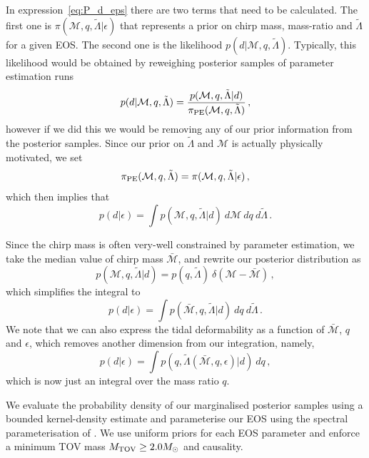 \documentclass[twocolumn]{aastex631}
\begin{document}
In expression~\eqref{eq:P_d_eps} there are two terms that need to be
calculated. The first one is $\pi(\mathcal{M}, q,
\tilde{\Lambda}|\epsilon)$ that represents a prior on chirp mass,
mass-ratio and $\tilde{\Lambda}$ for a given EOS. The second
one is the likelihood $p(d|\mathcal{M},q,\tilde{\Lambda})$. Typically,
this likelihood would be obtained by reweighing posterior samples of
parameter estimation runs
%
\begin{equation}
    p(d|\mathcal{M},q,\tilde{\Lambda}) =
    \frac{p(\mathcal{M},q,\tilde{\Lambda}|d)}{\pi_{\rm
        PE}(\mathcal{M},q,\tilde{\Lambda})}\,,
\end{equation}
%
however if we did this we would be removing any of our prior information
from the posterior samples. Since our prior on $\tilde{\Lambda}$ and
$\mathcal{M}$ is actually physically motivated, we set
%
\begin{equation}
    \pi_{\rm PE}(\mathcal{M},q,\tilde{\Lambda}) =
    \pi(\mathcal{M},q,\tilde{\Lambda}|\epsilon)\,,
\end{equation}
%
which then implies that
%
\begin{equation}
    p(d|\epsilon) = \int p(\mathcal{M},q,\tilde{\Lambda}|d)\ d
    \mathcal{M} \ d q \ d \tilde{\Lambda}\,.
\end{equation}

Since the chirp mass is often very-well constrained by parameter
estimation, we take the median value of chirp mass $\bar{\mathcal{M}}$,
and rewrite our posterior distribution as
%
\begin{equation}
    p(\mathcal{M},q,\tilde{\Lambda}|d) = p(q,\tilde{\Lambda})
    \ \delta(\mathcal{M}- \bar{\mathcal{M}})\,,
\end{equation}
%
which simplifies the integral to
%
\begin{equation}
    p(d|\epsilon) = \int p(\bar{\mathcal{M}},q,\tilde{\Lambda}|d)\ d q
    \ d \tilde{\Lambda}\,.
\end{equation}
%
We note that we can also express the tidal deformability as a function of
$\bar{\mathcal{M}}$, $q$ and $\epsilon$, which removes another dimension
from our integration, namely,
%
\begin{equation}
        p(d|\epsilon) = \int
        p(q,\tilde{\Lambda}(\bar{\mathcal{M}},q,\epsilon)|d)\ d q\,,
\end{equation}
%
which is now just an integral over the mass ratio $q$.

We evaluate the probability density of our marginalised posterior samples
using a bounded kernel-density estimate and parameterise our EOS using
the spectral parameterisation of \cite{Lindblom2010}. We use uniform
priors for each EOS parameter and enforce a minimum TOV mass $M_{\rm TOV}
\geq 2.0 M_{\odot}$ and causality.
	
\end{document}
